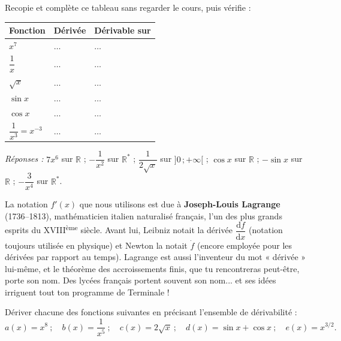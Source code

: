 \documentclass[11pt]{article}
\begin{document}
\begin{exemplebox}
Recopie et complète ce tableau sans regarder le cours, puis vérifie :
\begin{center}
\begin{tabularx}{\linewidth}{|X|X|X|}
\hline
\rowcolor{popblueL} \textbf{Fonction} & \textbf{Dérivée} & \textbf{Dérivable sur} \\
\hline
$x^7$ & $\ldots$ & $\ldots$ \\
\hline
$\dfrac{1}{x}$ & $\ldots$ & $\ldots$ \\
\hline
$\sqrt{x}$ & $\ldots$ & $\ldots$ \\
\hline
$\sin x$ & $\ldots$ & $\ldots$ \\
\hline
$\cos x$ & $\ldots$ & $\ldots$ \\
\hline
$\dfrac{1}{x^3} = x^{-3}$ & $\ldots$ & $\ldots$ \\
\hline
\end{tabularx}
\end{center}
\emph{Réponses :} $7x^6$ sur $\mathbb{R}$ ; $-\dfrac{1}{x^2}$ sur $\mathbb{R}^*$ ; $\dfrac{1}{2\sqrt{x}}$ sur $]0\,;+\infty[$ ; $\cos x$ sur $\mathbb{R}$ ; $-\sin x$ sur $\mathbb{R}$ ; $-\dfrac{3}{x^4}$ sur $\mathbb{R}^*$.
\end{exemplebox}

\begin{savaistu}
La notation $f'(x)$ que nous utilisons est due à \textbf{Joseph-Louis Lagrange} (1736--1813), mathématicien italien naturalisé français, l'un des plus grands esprits du XVIII\textsuperscript{ème} siècle. Avant lui, Leibniz notait la dérivée $\dfrac{\mathrm{d}f}{\mathrm{d}x}$ (notation toujours utilisée en physique) et Newton la notait $\dot{f}$ (encore employée pour les dérivées par rapport au temps). Lagrange est aussi l'inventeur du mot « dérivée » lui-même, et le théorème des accroissements finis, que tu rencontreras peut-être, porte son nom. Des lycées français portent souvent son nom... et ses idées irriguent tout ton programme de Terminale !
\end{savaistu}

\begin{exercice}
Dériver chacune des fonctions suivantes en précisant l'ensemble de dérivabilité :
\[ a(x) = x^8 \ ; \quad b(x) = \frac{1}{x^5} \ ; \quad c(x) = 2\sqrt{x} \ ; \quad d(x) = \sin x + \cos x \ ; \quad e(x) = x^{3/2}. \]
\end{exercice}
\end{document}
